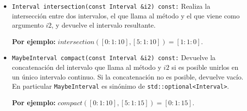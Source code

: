 \begin{itemize}
    \item \texttt{Interval intersection(const Interval \&i2) const:}  
    Realiza la intersección entre dos intervalos, el que llama al método y el que viene como argumento $i2$, y devuelve el intervalo resultante.

    \begin{center}
        \textbf{Por ejemplo:} $intersection([0: 1: 10],[5: 1: 10])=[1: 1: 0]$.
    \end{center}

    \item \texttt{MaybeInterval compact(const Interval \&i2) const:}  
    Devuelve la concatenación del intervalo que llama al método y $i2$ si es posible unirlos en un único intervalo continuo. Si la concatenación no es posible, devuelve vacío. En particular \texttt{MaybeInterval} es sinónimo de \texttt{std::optional<Interval>}.
    
    \begin{center}
        \textbf{Por ejemplo:} $compact([0: 1: 10],[5: 1: 15]) = [0: 1: 15]$.
    \end{center}
\end{itemize}

